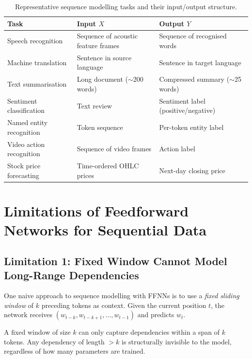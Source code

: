 \documentclass[12pt,a4paper]{article}
\begin{document}
\begin{table}[ht]
  \centering
  \caption{Representative sequence modelling tasks and their input/output
           structure.}
  \label{tab:applications}
  \begin{tabularx}{\linewidth}{lXX}
    \toprule
    \textbf{Task} & \textbf{Input $X$} & \textbf{Output $Y$} \\
    \midrule
    Speech recognition &
      Sequence of acoustic feature frames &
      Sequence of recognised words \\
    Machine translation &
      Sentence in source language &
      Sentence in target language \\
    Text summarisation &
      Long document ($\sim$200 words) &
      Compressed summary ($\sim$25 words) \\
    Sentiment classification &
      Text review &
      Sentiment label (positive/negative) \\
    Named entity recognition &
      Token sequence &
      Per-token entity label \\
    Video action recognition &
      Sequence of video frames &
      Action label \\
    Stock price forecasting &
      Time-ordered OHLC prices &
      Next-day closing price \\
    \bottomrule
  \end{tabularx}
\end{table}

\section{Limitations of Feedforward Networks for Sequential Data}
\label{sec:ffnn_limitations}

\subsection{Limitation 1: Fixed Window Cannot Model Long-Range Dependencies}
\label{subsec:fixed_window}

One naive approach to sequence modelling with FFNNs is to use a \emph{fixed
sliding window} of $k$ preceding tokens as context.  Given the current
position $t$, the network receives
$(w_{t-k}, w_{t-k+1}, \ldots, w_{t-1})$ and predicts $w_t$.

\begin{warningbox}
A fixed window of size $k$ can only capture dependencies within a span of
$k$ tokens.  Any dependency of length $> k$ is structurally invisible to
the model, regardless of how many parameters are trained.
\end{warningbox}
\end{document}

